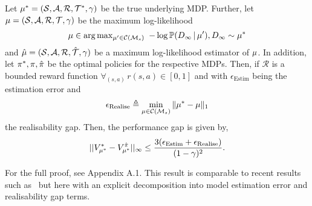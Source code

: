 \begin{theorem}\label{lemma:non-realisable}
Let $\mu^* = (\mathcal{S}, \mathcal{A}, \mathcal{R}, \mathcal{T}^*, \gamma)$ be the true underlying MDP. Further, let $\mu = (\mathcal{S}, \mathcal{A}, \mathcal{R}, \mathcal{T}, \gamma)$ be the maximum log-likelihood $$\mu \in \arg\max\nolimits_{\mu' \in \mathcal{C}(\mathcal{M}_s)}~- \log \mathbb{P}(D_\infty \, | \, \mu'), D_\infty \sim \mu^{*}$$ and $\hat{\mu} = (\mathcal{S}, \mathcal{A}, \mathcal{R}, \hat{\mathcal{T}}, \gamma)$ be a maximum log-likelihood estimator of $\mu$. In addition, let $\pi^*, \pi, \hat{\pi}$ be the optimal policies for the respective MDPs. Then, if $\mathcal{R}$ is a bounded reward function $\forall_{(s, a)} \, r(s, a) \in [0, 1]$ and with $\epsilon_{\mathrm{Estim}}$ being the estimation error and $$\epsilon_{\mathrm{Realise}} \triangleq \min_{\mu \in \mathcal{C}(\mathcal{M}_s)}\|\mu^{*}-\mu\|_1 $$ the realisability gap. Then, the performance gap is given by,
\begin{equation}
    ||V_{\mu^*}^*-V_{\mu^*}^{\hat{\pi}}||_\infty \leq \frac{3(\epsilon_{\mathrm{Estim}}+\epsilon_{\mathrm{Realise}})}{(1-\gamma)^2}.
\end{equation}

\end{theorem}
For the full proof, see %
Appendix A.1. This result is comparable to recent results such as~\citep{zhang2020multi} but here with an explicit decomposition into model estimation error and realisability gap terms.

